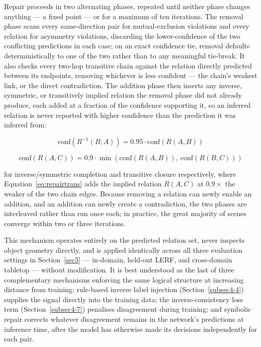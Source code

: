 \documentclass[sn-mathphys,Numbered]{sn-jnl}
\begin{document}
Repair proceeds in two alternating phases, repeated until neither phase changes anything --- a fixed point --- or for a maximum of ten iterations. The removal phase scans every same-direction pair for mutual-exclusion violations and every relation for asymmetry violations, discarding the lower-confidence of the two conflicting predictions in each case; on an exact confidence tie, removal defaults deterministically to one of the two rather than to any meaningful tie-break. It also checks every two-hop transitive chain against the relation directly predicted between its endpoints, removing whichever is less confident --- the chain's weakest link, or the direct contradiction. The addition phase then inserts any inverse, symmetric, or transitively implied relation the removal phase did not already produce, each added at a fraction of the confidence supporting it, so an inferred relation is never reported with higher confidence than the prediction it was inferred from:

\begin{equation}
\mathrm{conf}\!\left(R^{-1}(B,A)\right) = 0.95 \cdot \mathrm{conf}\!\left(R(A,B)\right)
\label{eq:repairinv}
\end{equation}

\begin{equation}
\mathrm{conf}\!\left(R(A,C)\right) = 0.9 \cdot \min\!\left(\mathrm{conf}(R(A,B)),\ \mathrm{conf}(R(B,C))\right)
\label{eq:repairtrans}
\end{equation}

for inverse/symmetric completion and transitive closure respectively, where Equation~\ref{eq:repairtrans} adds the implied relation $R(A,C)$ at $0.9\times$ the weaker of the two chain edges. Because removing a relation can newly enable an addition, and an addition can newly create a contradiction, the two phases are interleaved rather than run once each; in practice, the great majority of scenes converge within two or three iterations.

This mechanism operates entirely on the predicted relation set, never inspects object geometry directly, and is applied identically across all three evaluation settings in Section~\ref{sec5} --- in-domain, held-out LERF, and cross-domain tabletop --- without modification. It is best understood as the last of three complementary mechanisms enforcing the same logical structure at increasing distance from training: rule-based inverse label injection (Section~\ref{subsec4-4}) supplies the signal directly into the training data; the inverse-consistency loss term (Section~\ref{subsec4-7}) penalises disagreement during training; and symbolic repair corrects whatever disagreement remains in the network's predictions at inference time, after the model has otherwise made its decisions independently for each pair.
\end{document}
